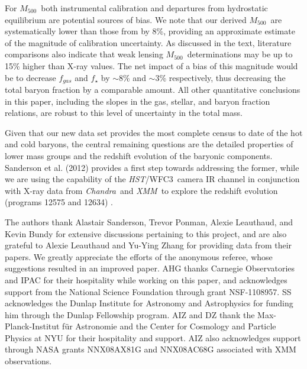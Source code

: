 \documentclass[preprint]{emulateapj}
\newcommand\mfive{${M}_{500}$}
\newcommand{\hst}{\textit{HST}}
\newcommand{\xmm}{\textit{XMM}}
\newcommand{\chandra}{\textit{Chandra}}
\newcommand{\wfc}{WFC3}
\begin{document}
\begin{enumerate}
{    For \mfive\ both instrumental calibration and departures from
    hydrostatic equilibrium are potential sources of bias. We note that our derived
    \mfive\ are systematically lower than those from \cite{vikhlinin2006} by 8\%, providing
    an approximate estimate of the magnitude of calibration uncertainty. As discussed in
    the text, literature comparisons also indicate that weak lensing \mfive\ determinations may be up to 15\%
    higher than X-ray values. The net impact of a bias of this magnitude would be to decrease $f_{gas}$ and
    $f_{\star}$ by $\sim8$\% and $\sim3$\% respectively, thus decreasing the total baryon fraction by a comparable
    amount. All other quantitative conclusions in this paper, including the slopes in the gas, stellar, and baryon fraction
    relations,  are robust to this level of uncertainty in the total mass.
    }

\end{enumerate}

Given that our new data set provides the most complete census to date
of the hot and cold baryons, the central remaining questions are the
detailed properties of lower mass groups and the redshift evolution of
the baryonic components.  Sanderson et al. (2012) provides a first
step towards addressing the former, while we are using the capability
of the \hst/\wfc\ camera IR channel in conjunction with X-ray data
from \chandra\ and \xmm\ to explore the redshift evolution (programs
12575 and 12634) .








\acknowledgements The authors thank Alastair Sanderson, Trevor Ponman,
Alexie Leauthaud, and Kevin Bundy for extensive discussions pertaining
to this project, and are also grateful to Alexie Leauthaud and Yu-Ying
Zhang for providing data from their papers. We greatly appreciate the
efforts of the anonymous referee, whose suggestions resulted in an
improved paper.  AHG thanks Carnegie Observatories and IPAC for their
hospitality while working on this paper, and acknowledges support from
the National Science Foundation through grant NSF-1108957. SS
acknowledges the Dunlap Institute for Astronomy and Astrophysics for
funding him through the Dunlap Fellowship program.  AIZ and DZ thank
the Max-Planck-Institut f\"ur Astronomie and the Center for Cosmology
and Particle Physics at NYU for their hospitality and support.  AIZ
also acknowledges support through NASA grants NNX08AX81G and
NNX08AC68G associated with XMM observations.
\end{document}
